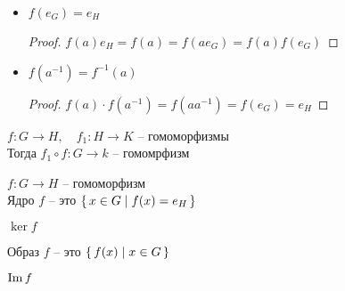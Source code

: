\begin{props}
	\item
    \begin{itemize}
    	\item $ f(e_G) = e_H $
        \begin{proof}
        	$ f(a)e_H = f(a) = f(ae_G) = f(a)f(e_G) $
        \end{proof}
        \item $ f(a^{-1}) = f^{-1}(a) $
        \begin{proof}
            $ f(a) \cdot f(a^{-1}) = f(aa^{-1}) = f(e_G) = e_H $
        \end{proof}
    \end{itemize}
    \item $ f : G \to H, \quad f_1 : H \to K $ -- гомоморфизмы \\
    Тогда $ f_1 \circ f : G \to k $ -- гомомрфизм
\end{props}

\begin{definition}
	$ f : G \to H $ -- гомоморфизм \\
    Ядро $ f $ -- это $ \set{x \in G | f(x) = e_H} $
    \begin{notation}
    	$ \ker f $
    \end{notation}
    Образ $ f $ -- это $ \set{f(x) | x \in G} $
    \begin{notation}
    	$ \operatorname{Im} f $
    \end{notation}
\end{definition}

